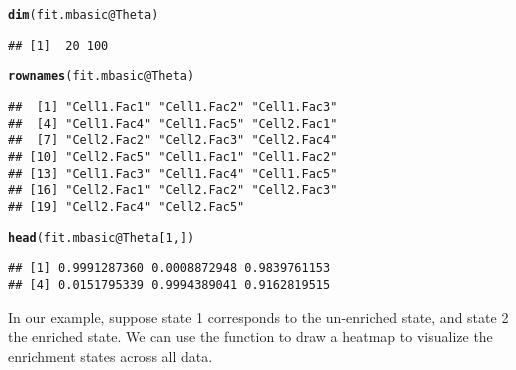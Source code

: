 \documentclass[a4paper,10pt]{article}\usepackage[]{graphicx}\usepackage[]{color}
\makeatletter
\newcommand{\hlnum}[1]{\textcolor[rgb]{0.686,0.059,0.569}{#1}}%
\newcommand{\hlopt}[1]{\textcolor[rgb]{0,0,0}{#1}}%
\newcommand{\hlstd}[1]{\textcolor[rgb]{0.345,0.345,0.345}{#1}}%
\newcommand{\hlkwc}[1]{\textcolor[rgb]{0.333,0.667,0.333}{#1}}%
\newcommand{\hlkwd}[1]{\textcolor[rgb]{0.737,0.353,0.396}{\textbf{#1}}}%
\newenvironment{kframe}{%
 \def\at@end@of@kframe{}%
 \ifinner\ifhmode%
  \def\at@end@of@kframe{\end{minipage}}%
  \begin{minipage}{\columnwidth}%
 \fi\fi%
 \def\FrameCommand##1{\hskip\@totalleftmargin \hskip-\fboxsep
 \colorbox{shadecolor}{##1}\hskip-\fboxsep
     \hskip-\linewidth \hskip-\@totalleftmargin \hskip\columnwidth}%
 \MakeFramed {\advance\hsize-\width
   \@totalleftmargin\z@ \linewidth\hsize
   \@setminipage}}%
 {\par\unskip\endMakeFramed%
 \at@end@of@kframe}
\newenvironment{knitrout}{}{} %
\makeatother
\begin{document}
\begin{knitrout}
\color{fgcolor}\begin{kframe}
\begin{alltt}
\hlkwd{dim}\hlstd{(fit.mbasic}\hlopt{@}\hlkwc{Theta}\hlstd{)}
\end{alltt}
\begin{verbatim}
## [1]  20 100
\end{verbatim}
\begin{alltt}
\hlkwd{rownames}\hlstd{(fit.mbasic}\hlopt{@}\hlkwc{Theta}\hlstd{)}
\end{alltt}
\begin{verbatim}
##  [1] "Cell1.Fac1" "Cell1.Fac2" "Cell1.Fac3"
##  [4] "Cell1.Fac4" "Cell1.Fac5" "Cell2.Fac1"
##  [7] "Cell2.Fac2" "Cell2.Fac3" "Cell2.Fac4"
## [10] "Cell2.Fac5" "Cell1.Fac1" "Cell1.Fac2"
## [13] "Cell1.Fac3" "Cell1.Fac4" "Cell1.Fac5"
## [16] "Cell2.Fac1" "Cell2.Fac2" "Cell2.Fac3"
## [19] "Cell2.Fac4" "Cell2.Fac5"
\end{verbatim}
\begin{alltt}
\hlkwd{head}\hlstd{(fit.mbasic}\hlopt{@}\hlkwc{Theta}\hlstd{[}\hlnum{1}\hlstd{, ])}
\end{alltt}
\begin{verbatim}
## [1] 0.9991287360 0.0008872948 0.9839761153
## [4] 0.0151795339 0.9994389041 0.9162819515
\end{verbatim}
\end{kframe}
\end{knitrout}

In our example, suppose state 1 corresponds to the un-enriched state, and state 2 the enriched state. We can use the function  to draw a heatmap to visualize the enrichment states across all data.
\end{document}
